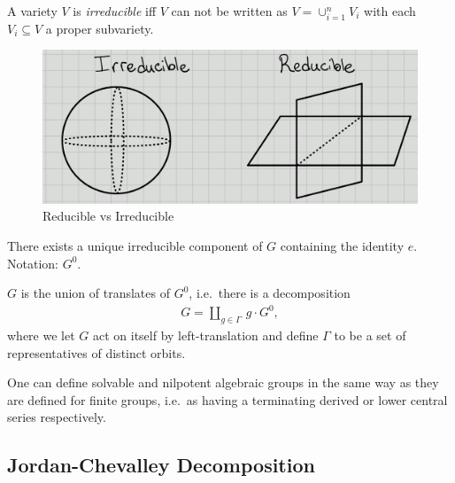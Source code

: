 \begin{definition}[Irreducible]

A variety \(V\) is \emph{irreducible} iff \(V\) can not be written as
\(V = \cup_{i=1}^n V_i\) with each \(V_i \subseteq V\) a proper
subvariety.

\begin{figure}
\centering
\includegraphics{figures/Reducible_v_irreducible.png}
\caption{Reducible vs Irreducible}
\end{figure}

\end{definition}

\begin{proposition}[?]

There exists a unique irreducible component of \(G\) containing the
identity \(e\). Notation: \(G^0\).

\end{proposition}

\begin{proposition}[?]

\(G\) is the union of translates of \(G^0\), i.e.~there is a
decomposition
\begin{align*}  
G = {\coprod}_{g\in \Gamma} \, g\cdot G^0
,\end{align*}
where we let \(G\) act on itself by left-translation and define
\(\Gamma\) to be a set of representatives of distinct orbits.

\end{proposition}

\begin{proposition}[?]

One can define solvable and nilpotent algebraic groups in the same way
as they are defined for finite groups, i.e.~as having a terminating
derived or lower central series respectively.

\end{proposition}

\hypertarget{jordan-chevalley-decomposition}{%
\subsection{Jordan-Chevalley
Decomposition}\label{jordan-chevalley-decomposition}}

